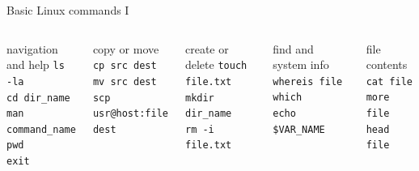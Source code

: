 \documentclass{beamer}
\begin{document}
\begin{frame}{Basic Linux commands I}
  \begin{columns}
    \begin{block}{navigation and help}
      \texttt{ls -la} \\
      \texttt{cd dir\_name} \\
      \texttt{man command\_name} \\
      \texttt{pwd} \\
      \texttt{exit}
    \end{block}
    \begin{block}{copy or move}
      \texttt{cp src dest} \\
      \texttt{mv src dest} \\
      \texttt{scp usr@host:file dest}
    \end{block}

    \begin{block}{create or delete}
      \texttt{touch file.txt} \\ 
      \texttt{mkdir dir\_name} \\ 
      \texttt{rm -i file.txt}
    \end{block}
    \begin{block}{find and system info}
      \texttt{whereis file} \\
      \texttt{which} \\
      \texttt{echo \$VAR\_NAME}
    \end{block}
    \begin{block}{file contents}
      \texttt{cat file} \\
      \texttt{more file} \\
      \texttt{head file}
    \end{block}    
  \end{columns}
\end{frame}
\end{document}

